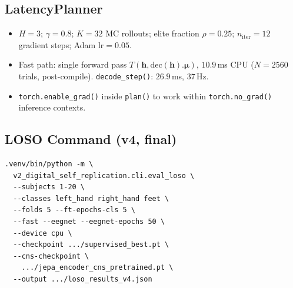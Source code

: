 \documentclass[journal]{IEEEtran}
\begin{document}
\subsection{LatencyPlanner}
\begin{itemize}
  \item $H=3$; $\gamma=0.8$; $K=32$ MC rollouts; elite fraction $\rho=0.25$; $n_\text{iter}=12$ gradient steps; Adam $\text{lr}=0.05$.
  \item Fast path: single forward pass $T(\mathbf{h}, \text{dec}(\mathbf{h}).\bm\mu)$, $10.9$\,ms CPU ($N=2560$ trials, post-compile). \texttt{decode\_step()}: $26.9$\,ms, $37$\,Hz.
  \item \texttt{torch.enable\_grad()} inside \texttt{plan()} to work within \texttt{torch.no\_grad()} inference contexts.
\end{itemize}

\subsection{LOSO Command (v4, final)}
{\footnotesize
\begin{verbatim}
.venv/bin/python -m \
  v2_digital_self_replication.cli.eval_loso \
  --subjects 1-20 \
  --classes left_hand right_hand feet \
  --folds 5 --ft-epochs-cls 5 \
  --fast --eegnet --eegnet-epochs 50 \
  --device cpu \
  --checkpoint .../supervised_best.pt \
  --cns-checkpoint \
    .../jepa_encoder_cns_pretrained.pt \
  --output .../loso_results_v4.json
\end{verbatim}
}
\end{document}
